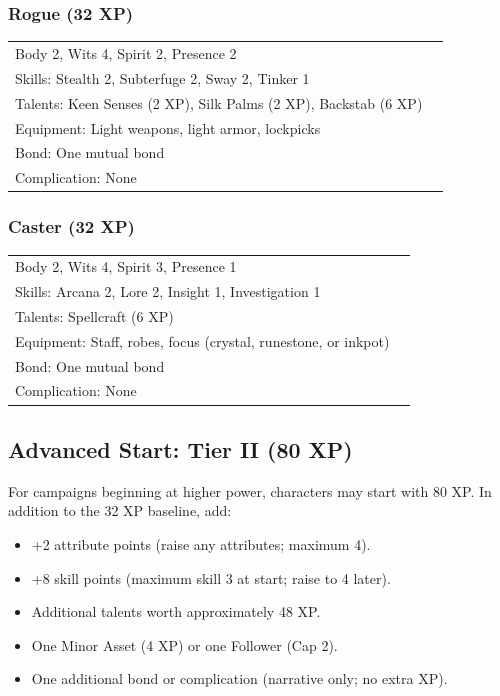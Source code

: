 \subsubsection{Rogue (32 XP)}
\begin{tabular}{@{}ll@{}}
Body 2, Wits 4, Spirit 2, Presence 2 \\
Skills: Stealth 2, Subterfuge 2, Sway 2, Tinker 1 \\
Talents: Keen Senses (2 XP), Silk Palms (2 XP), Backstab (6 XP) \\
Equipment: Light weapons, light armor, lockpicks \\
Bond: One mutual bond \\
Complication: None \\
\end{tabular}

\subsubsection{Caster (32 XP)}
\begin{tabular}{@{}ll@{}}
Body 2, Wits 4, Spirit 3, Presence 1 \\
Skills: Arcana 2, Lore 2, Insight 1, Investigation 1 \\
Talents: Spellcraft (6 XP) \\
Equipment: Staff, robes, focus (crystal, runestone, or inkpot) \\
Bond: One mutual bond \\
Complication: None \\
\end{tabular}

\subsection{Advanced Start: Tier II (80 XP)}

For campaigns beginning at higher power, characters may start with 80 XP. In addition to the 32 XP baseline, add:

\begin{itemize}
  \item +2 attribute points (raise any attributes; maximum 4).
  \item +8 skill points (maximum skill 3 at start; raise to 4 later).
  \item Additional talents worth approximately 48 XP.
  \item One Minor Asset (4 XP) or one Follower (Cap 2).
  \item One additional bond or complication (narrative only; no extra XP).
\end{itemize}

